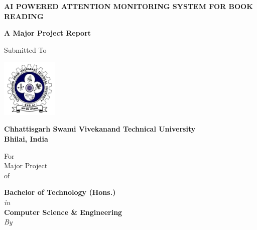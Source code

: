 \begin{titlepage}
  \centering
  
  {\LARGE\bfseries AI POWERED ATTENTION MONITORING SYSTEM FOR BOOK READING\par}
  \vspace{0.5cm}
  
  {\Large\textbf{A Major Project Report}\par}
  
  {\Large Submitted To\par}
  \vspace{0.4cm}
  
  \includegraphics[width=0.2\textwidth]{images/logo.png}\par
  
  {\Large\textbf{Chhattisgarh Swami Vivekanand Technical University\\Bhilai, India}\par}
  
  \large For \\ Major Project \\ of \par
  
  \textbf{Bachelor of Technology (Hons.)} \\\textit{in} \\\textbf{Computer Science \& Engineering} \\\textit{By}\par
  \vspace{0.5cm}
  

\end{titlepage}
